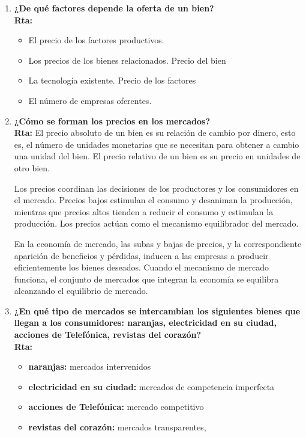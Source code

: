 \documentclass[12pt]{book}
\begin{document}
\begin{enumerate}
\item \textbf{¿De qué factores depende la oferta de un bien?}
\\
\textbf{Rta:}
\begin{itemize}
\item El precio de los factores productivos.
\item Los precios de los bienes relacionados. Precio del bien
\item La tecnología existente. Precio de los factores
\item El número de empresas oferentes.
\end{itemize}

\item \textbf{¿Cómo se forman los precios en los mercados?}
\\
\textbf{Rta:} El precio absoluto de un bien es su relación de cambio por dinero, esto es, el número de unidades monetarias que se necesitan para obtener a cambio una unidad del bien. El precio relativo de un bien es su precio en unidades de otro bien.

Los precios coordinan las decisiones de los productores y los consumidores en el mercado.
Precios bajos estimulan el consumo y desaniman la producción, mientras que precios altos tienden a reducir el consumo y estimulan la producción. Los precios actúan como el mecanismo equilibrador del mercado.

En la economía de mercado, las subas y bajas de precios, y la correspondiente aparición de beneficios y pérdidas, inducen a las empresas a producir eficientemente los bienes deseados.
Cuando el mecanismo de mercado funciona, el conjunto de mercados que integran la economía se equilibra alcanzando el equilibrio de mercado.
	

\item \textbf{¿En qué tipo de mercados se intercambian los siguientes bienes que llegan a los consumidores: naranjas, electricidad en su ciudad, acciones de Telefónica, revistas del corazón?}
\\
\textbf{Rta:}

\begin{itemize}
\item \textbf{naranjas: }mercados intervenidos
\item \textbf{electricidad en su ciudad: }mercados de competencia imperfecta
\item \textbf{acciones de Telefónica: }mercado competitivo
\item \textbf{revistas del corazón: }mercados transparentes,
\end{itemize}



\end{enumerate}
\end{document}
